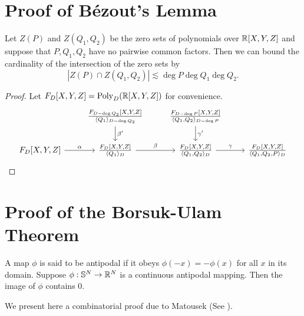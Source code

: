 \chapter{Proof of Bézout's Lemma}

\begin{lemma}    
    Let $Z(P)$ and $Z(Q_1,Q_2)$ be the zero sets of polynomials over $\mathbb R[X,Y,Z]$ and suppose that $P,Q_1,Q_2$ have no pairwise common factors.
  Then we can bound the cardinality of the intersection of the zero sets by
     \[ |Z(P) \cap Z(Q_1,Q_2)| \lesssim \deg P \deg Q_1 \deg Q_2.\]
 \end{lemma}
\begin{proof}
    Let $F_D [X,Y,Z] = \operatorname{Poly}_D (\mathbb R[X,Y,Z])$ for convenience. 
        \[\begin{tikzcd}
            & {\frac{F_{D-\deg Q_2}[X,Y,Z]}{\langle Q_1 \rangle_{D- \deg Q_2}}} & {\frac{F_{D-\deg P}[X,Y,Z]}{\langle Q_1, Q_2 \rangle_{D- \deg P}}} \\
            {F_D[X,Y,Z]} & {\frac{F_D[X,Y,Z]}{\langle Q_1 \rangle_D}} & {\frac{F_D[X,Y,Z]}{\langle Q_1, Q_2 \rangle_D}} & {\frac{F_D[X,Y,Z]}{\langle Q_1, Q_2, P \rangle_D}}
            \arrow["\alpha", from=2-1, to=2-2]
            \arrow["\beta", from=2-2, to=2-3]
            \arrow["\gamma", from=2-3, to=2-4]
            \arrow["{\beta'}", from=1-2, to=2-2]
            \arrow["{\gamma'}", from=1-3, to=2-3]
        \end{tikzcd}\]

\end{proof}



\chapter{Proof of the Borsuk-Ulam Theorem}
    \begin{theorem}
        A map $\phi$ is said to be antipodal if it obeys $\phi (-x) = -\phi(x)$ for all $x$ in its domain. Suppose $\phi: \mathbb S^N \to \mathbb R^N$ is a continuous antipodal mapping. 
        Then the image of $\phi$ contains 0. \label{appendix:Borsuk-Ulam}
    \end{theorem}
We present here a combinatorial proof due to Matousek (See \cite{matouvsek2003using}).

